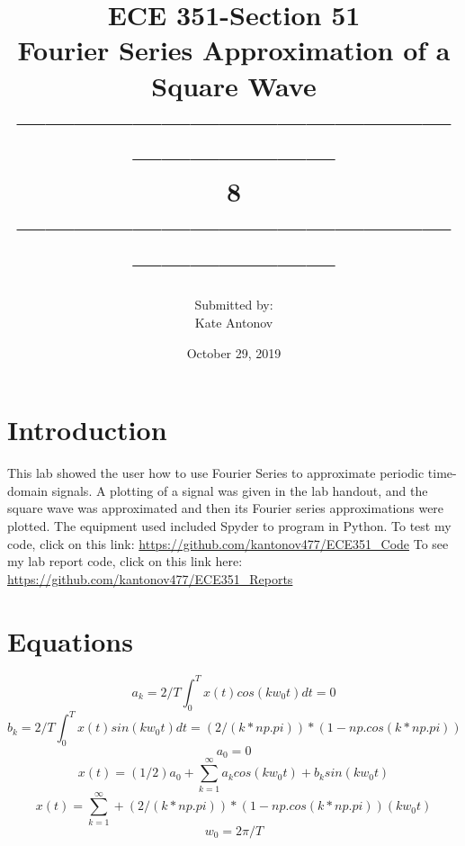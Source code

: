 \documentclass[12pt]{article}
\title{ECE 351-Section 51 \\ Fourier Series Approximation of a Square Wave
 \\ ------------------------------------------------------------------\\ 8 \\------------------------------------------------------------------}
\author{Submitted by: \\  Kate Antonov}
\date{October 29, 2019}
\begin{document}
\vspace{\fill}

\maketitle

\vspace{\fill}
\thispagestyle{empty}
\clearpage

\clearpage
\thispagestyle{empty}
\tableofcontents
\clearpage

\section{Introduction}
This lab showed the user how to use Fourier Series to approximate periodic time-domain signals. A plotting of a signal was given in the lab handout, and the square wave was approximated and then its Fourier series approximations were plotted.
The equipment used included Spyder to program in Python. To test my code, click on this link: 
\url{https://github.com/kantonov477/ECE351_Code}
\newline
To see my lab report code, click on this link here: 
\url{https://github.com/kantonov477/ECE351_Reports}
\section{Equations}
\[a_k = 2/T\int_{0}^{T} x(t)cos(kw_0t) dt = 0\]
\[b_k = 2/T\int_{0}^{T} x(t)sin(kw_0t) dt = (2/(k*np.pi))*(1 - np.cos(k*np.pi))\]
\[a_0 = 0\]
\[x(t) = (1/2)a_0 + \sum_{k=1}^{\infty} a_kcos(kw_0t) + b_ksin(kw_0t)\] 
\[x(t) = \sum_{k=1}^{\infty} + (2/(k*np.pi))*(1 - np.cos(k*np.pi))(kw_0t)\]
\[w_0 = 2\pi/T\]
\end{document}
